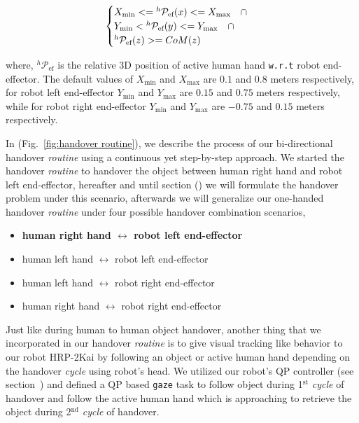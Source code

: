 \begin{equation}\label{reachable}
	\centering
	\begin{cases}
	
		X_{\min} <= {}^{h}\mathcal{P}_{\text{ef}}(x) <= X_{\max} \quad \cap \\
		Y_{\min} < {}^{h}\mathcal{P}_{\text{ef}}(y) <= Y_{\max} \quad \cap \\
		{}^{h}\mathcal{P}_{\text{ef}}(z) >= CoM(z)
			
	\end{cases}
\end{equation}

where, $ {}^{h}\mathcal{P}_{\text{ef}} $ is the relative 3D position of active human hand \texttt{w.r.t} robot end-effector. The default values of $ X_{\min} $ and $ X_{\max} $ are $ 0.1 $ and $ 0.8 $ meters respectively, for robot left end-effector $ Y_{\min} $ and $ Y_{\max} $ are $ 0.15 $ and $ 0.75 $ meters respectively, while for robot right end-effector $ Y_{\min} $ and $ Y_{\max} $ are $ -0.75 $ and $ 0.15 $ meters respectively.

In (Fig.~\ref{fig:handover routine}), we describe the process of our bi-directional handover \textit{routine} using a continuous yet step-by-step approach. We started the handover \textit{routine} to handover the object between human right hand and robot left end-effector, hereafter and until section () we will formulate the handover problem under this scenario, afterwards we will generalize our one-handed handover \textit{routine} under four possible handover combination scenarios,

\begin{itemize}
	\item \textbf{human right hand $\longleftrightarrow$ robot left end-effector}
	\item human left hand $\longleftrightarrow$ robot left end-effector 
	\item human left hand $\longleftrightarrow$  robot right end-effector
	\item human right hand $\longleftrightarrow$ robot right end-effector
\end{itemize}


Just like during human to human object handover, another thing that we incorporated in our handover \textit{routine} is to give visual tracking like behavior to our robot HRP-2Kai by following an object or active human hand depending on the handover \textit{cycle} using robot's head. We utilized our robot's QP controller (see section~) and defined a QP based \texttt{gaze} task to follow object during 1$^\text{st}$ \textit{cycle} of handover and follow the active human hand which is approaching to retrieve the object during 2$^\text{nd}$ \textit{cycle} of handover.

